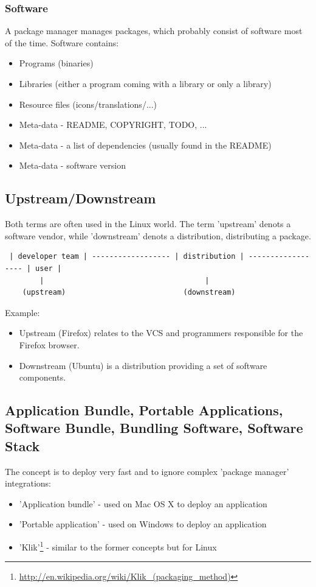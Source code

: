 \documentclass[a4paper,10pt]{article}
\begin{document}
\subsubsection*{Software}
A package manager manages packages, which probably consist of software most of the time. Software contains:
\begin{itemize}
 \item Programs (binaries)
 \item Libraries (either a program coming with a library or only a library)
 \item Resource files (icons/translations/...)
 \item Meta-data - README, COPYRIGHT, TODO, ...
 \item Meta-data - a list of dependencies (usually found in the README)
 \item Meta-data - software version 
\end{itemize}







\subsection{Upstream/Downstream}
Both terms are often used in the Linux world. The term 'upstream' denots a software vendor, while 'downstream' denots a distribution, distributing a package.

\begin{verbatim}
 | developer team | ------------------ | distribution | ------------------ | user |
        |                                     |
    (upstream)                           (downstream)
\end{verbatim}

Example: 
\begin{itemize}
 \item Upstream (Firefox) relates to the VCS and programmers responsible for the Firefox browser.
 \item Downstream (Ubuntu) is a distribution providing a set of software components.
\end{itemize}







\subsection{Application Bundle, Portable Applications, Software Bundle, Bundling Software, Software Stack}
The concept is to deploy very fast and to ignore complex 'package manager' integrations:
\begin{itemize}
\item 'Application bundle' - used on Mac OS X to deploy an application
\item 'Portable application' - used on Windows to deploy an application 
\item 'Klik'\footnote{\url{ http://en.wikipedia.org/wiki/Klik\_(packaging\_method)}} - similar to the former concepts but for Linux
\end{itemize}
\end{document}
